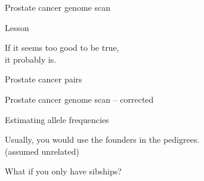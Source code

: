 \documentclass[aspectratio=169,12pt,t]{beamer}
\begin{document}
\begin{frame}[c]{Prostate cancer genome scan}

\note{
}

\end{frame}

\begin{frame}[c]{Lesson}

\centering
\Large
If it seems too good to be true, \\[12pt]
it probably is.


\note{
}

\end{frame}



\begin{frame}[c]{Prostate cancer pairs}

\note{
}

\end{frame}



\begin{frame}[c]{Prostate cancer genome scan -- corrected}

\note{
}

\end{frame}


\begin{frame}{Estimating allele frequencies}

  \bigskip

  Usually, you would use the {\hilit founders} in the pedigrees. \\
  \qquad (assumed unrelated)

  \bigskip \bigskip

  What if you only have {\vhilit sibships}?


\note{
}

\end{frame}
\end{document}
